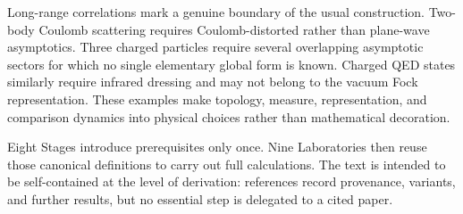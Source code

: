 Long-range correlations mark a genuine boundary of the usual construction.
Two-body Coulomb scattering requires Coulomb-distorted rather than plane-wave
asymptotics.  Three charged particles require several overlapping asymptotic
sectors for which no single elementary global form is known.  Charged QED
states similarly require infrared dressing and may not belong to the vacuum
Fock representation.  These examples make topology, measure, representation,
and comparison dynamics into physical choices rather than mathematical
decoration.

Eight Stages introduce prerequisites only once.  Nine Laboratories then
reuse those canonical definitions to carry out full calculations.  The text
is intended to be self-contained at the level of derivation: references
record provenance, variants, and further results, but no essential step is
delegated to a cited paper.
